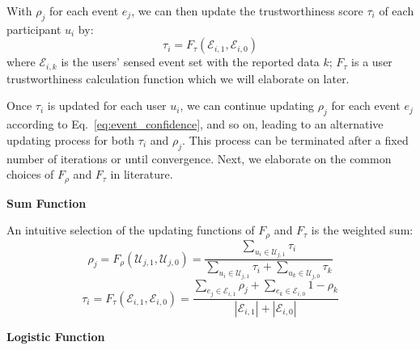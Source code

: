 With $\rho_j$ for each event $e_j$, we can then update the trustworthiness score $\tau_i$ of each participant $u_i$ by:
\begin{equation}
\tau_i = F_\tau(\mathcal E_{i,1}, \mathcal E_{i,0})
\end{equation}
where $\mathcal E_{i,k}$ is the users' sensed event set with the reported data $k$; $F_\tau$ is a user trustworthiness calculation function which we will elaborate on later. 

Once $\tau_i$ is updated for each user $u_i$, we can continue updating $\rho_j$ for each event $e_j$ according to Eq.~\ref{eq:event_confidence}, and so on, leading to an alternative updating process for both $\tau_i$ and $\rho_j$. This process can be terminated after a fixed number of iterations or until convergence. Next, we elaborate on the common choices of $F_\rho$ and $F_\tau$ in literature.

\textbf{Sum Function}

An intuitive selection of the updating functions of $F_\rho$ and $F_\tau$ is the weighted sum:
\begin{equation}
\rho_j = F_\rho(\mathcal U_{j,1}, \mathcal U_{j,0}) = \frac{\sum_{u_i \in \mathcal U_{j,1}} \tau_i}{\sum_{u_i \in \mathcal U_{j,1}} \tau_i + \sum_{u_k \in \mathcal U_{j,0}} \tau_k}
\label{eq:rho_function_sum}
\end{equation}
\begin{equation}
\tau_i = F_\tau(\mathcal E_{i,1}, \mathcal E_{i,0}) = \frac{\sum_{e_j \in \mathcal E_{i,1}} \rho_j + \sum_{e_k \in \mathcal E_{i,0}} 1-\rho_k}{|\mathcal E_{i,1}|+|\mathcal E_{i,0}|}
\label{eq:tau_function}
\end{equation}

\textbf{Logistic Function}

